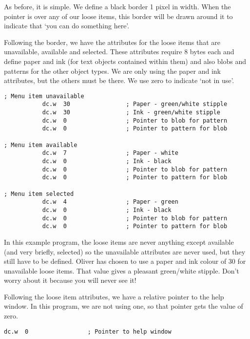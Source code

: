 As before, it is simple. We define a black border 1 pixel in width.
    When the pointer is over any of our loose items, this border will be drawn
    around it to indicate that `you can do something here'.

Following the border, we have the attributes for the loose items
    that are unavailable, available and selected. These attributes require 8
    bytes each and define paper and ink (for text objects contained within
    them) and also blobs and patterns for the other object types. We are only
    using the paper and ink attributes, but the others must be there. We use
    zero to indicate `not in use'.

\begin{lstlisting}[firstnumber=last,caption={Main Window - Loose Item Attributes}]
; Menu item unavailable
           dc.w  30                ; Paper - green/white stipple
           dc.w  30                ; Ink - green/white stipple 
           dc.w  0                 ; Pointer to blob for pattern
           dc.w  0                 ; Pointer to pattern for blob

; Menu item available
           dc.w  7                 ; Paper - white
           dc.w  0                 ; Ink - black
           dc.w  0                 ; Pointer to blob for pattern
           dc.w  0                 ; Pointer to pattern for blob

; Menu item selected
           dc.w  4                 ; Paper - green
           dc.w  0                 ; Ink - black
           dc.w  0                 ; Pointer to blob for pattern
           dc.w  0                 ; Pointer to pattern for blob
\end{lstlisting}

In this example program, the loose items are never anything except
    available (and very briefly, selected) so the unavailable attributes are
    never used, but they still have to be defined. Oliver has chosen to use a
    paper and ink colour of 30 for unavailable loose items. That value gives a
    pleasant green/white stipple. Don't worry about it because you will never
    see it!

Following the loose item attributes, we have a relative pointer to
    the help window. In this program, we are not using one, so that pointer
    gets the value of zero.

\begin{lstlisting}[firstnumber=last,caption={Main Window - Help Window Details}]
           dc.w  0                 ; Pointer to help window
\end{lstlisting}

